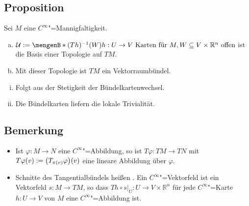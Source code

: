 \subsection[Proposition: Topologie auf $T M$, die $T M$ zu einem Vektorraumbündel macht]{Proposition} %
\label{sub:198}
Sei $M$ eine $C^\infty$"=Mannigfaltigkeit.
\begin{enumerate}[a)]
	\item $\mathcal{U} := \set[(T h) ^{-1} (W)]{h : U \to V \text{ Karten für }M , W \subseteq V \times\mathds{R}^n \text{ offen}} $ ist die Basis einer Topologie auf $T M$.
	\item Mit dieser Topologie ist $T M$ ein Vektorraumbündel.
\end{enumerate}
\begin{enumerate}[(i)]
	\item Folgt aus der Stetigkeit der Bündelkartenwechsel.
	\item Die Bündelkarten liefern die lokale Trivialität. \bewende
\end{enumerate}

\subsection[Bemerkung: $T \varphi : T M  \to T N$ ist linear, Vektorfelder als Schnitte von $T M$]{Bemerkung} %
\label{sub:199}
\begin{itemize}
	\item Ist $\varphi : M \to N$ eine $C^\infty$"=Abbildung, so ist $T \varphi : T M  \to T N$ mit $T \varphi(v) := \enbrace*{T_{\pi(v)} \varphi}(v)$ eine lineare Abbildung 
	über $\varphi$.
	\item Schnitte des Tangentialbündels heißen . Ein $C^\infty$"=Vektorfeld ist ein Vektorfeld $s : M \to T M$, so dass 
	$T h \circ s \big|_{U} : U \to V \times \mathds{R}^n$ für jede $C^\infty$"=Karte $h : U \to V$ von $M$ eine $C^\infty$"=Abbildung ist.
\end{itemize}


